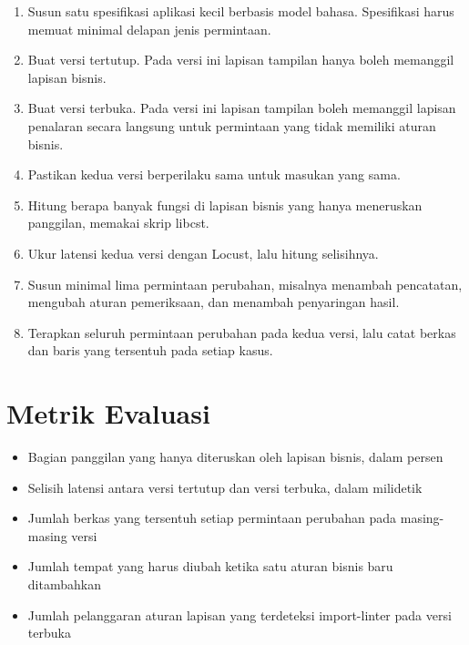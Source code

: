 \documentclass[11pt,a4paper]{article}
\begin{document}
\begin{enumerate}[leftmargin=*]
  \item Susun satu spesifikasi aplikasi kecil berbasis model bahasa. Spesifikasi harus memuat minimal delapan jenis permintaan.
  \item Buat versi tertutup. Pada versi ini lapisan tampilan hanya boleh memanggil lapisan bisnis.
  \item Buat versi terbuka. Pada versi ini lapisan tampilan boleh memanggil lapisan penalaran secara langsung untuk permintaan yang tidak memiliki aturan bisnis.
  \item Pastikan kedua versi berperilaku sama untuk masukan yang sama.
  \item Hitung berapa banyak fungsi di lapisan bisnis yang hanya meneruskan panggilan, memakai skrip libcst.
  \item Ukur latensi kedua versi dengan Locust, lalu hitung selisihnya.
  \item Susun minimal lima permintaan perubahan, misalnya menambah pencatatan, mengubah aturan pemeriksaan, dan menambah penyaringan hasil.
  \item Terapkan seluruh permintaan perubahan pada kedua versi, lalu catat berkas dan baris yang tersentuh pada setiap kasus.
\end{enumerate}

\section{Metrik Evaluasi}

\begin{itemize}[leftmargin=*]
  \item Bagian panggilan yang hanya diteruskan oleh lapisan bisnis, dalam persen
  \item Selisih latensi antara versi tertutup dan versi terbuka, dalam milidetik
  \item Jumlah berkas yang tersentuh setiap permintaan perubahan pada masing-masing versi
  \item Jumlah tempat yang harus diubah ketika satu aturan bisnis baru ditambahkan
  \item Jumlah pelanggaran aturan lapisan yang terdeteksi import-linter pada versi terbuka
\end{itemize}



\end{document}
